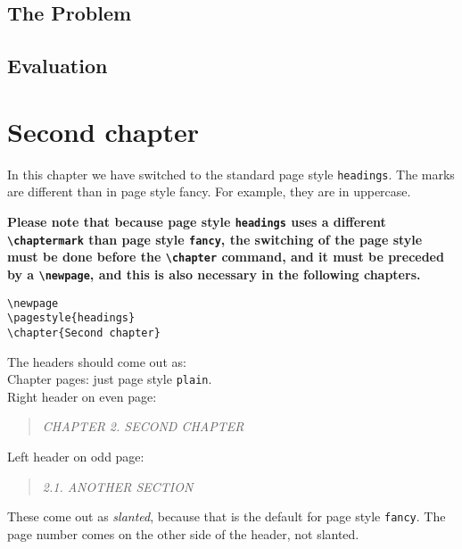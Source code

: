 \documentclass[openany]{book}
\renewcommand{\chaptermark}[1]{\markboth{\thechapter.\ #1}{}}
\renewcommand{\chaptermark}[1]{\markboth{\thechapter.\ ##1}{}}
\renewcommand{\chaptermark}[1]{\markboth{\thechapter.\ ##1}{}}
\begin{document}
\lipsum[1]
\newpage
\section{The Problem}
\label{sec:problem}

\lipsum[2-3]

\section{Evaluation}

\lipsum[3-5]

\lipsum[6]

\newpage
\pagestyle{headings}
\chapter{Second chapter}

\noindent
\begin{boxedminipage}{\textwidth}
In this chapter we have switched to the standard page style \texttt{headings}. The marks are different than in page style fancy. For example, they are in uppercase.

{\bfseries Please note that because page style \texttt{headings} uses a different \verb|\chaptermark| than page style \texttt{fancy}, the switching of the page style must be done before the \verb|\chapter| command, and it must be preceded by a \verb|\newpage|, and this is also necessary in the following chapters.}
\begin{verbatim}
\newpage
\pagestyle{headings}
\chapter{Second chapter}
\end{verbatim}

The headers should come out as:
\\
Chapter pages: just page style \texttt{plain}.
\\
Right header on even page:
\begin{quote}
  \textsl{CHAPTER 2. SECOND CHAPTER}
\end{quote}
Left header on odd page:
\begin{quote}
  \textsl{2.1. ANOTHER SECTION}
\end{quote}
These come out as \textsl{slanted}, because that is the default for page style \texttt{fancy}.
The page number comes on the other side of the header, not slanted.
\end{boxedminipage}
\bigskip
\end{document}
